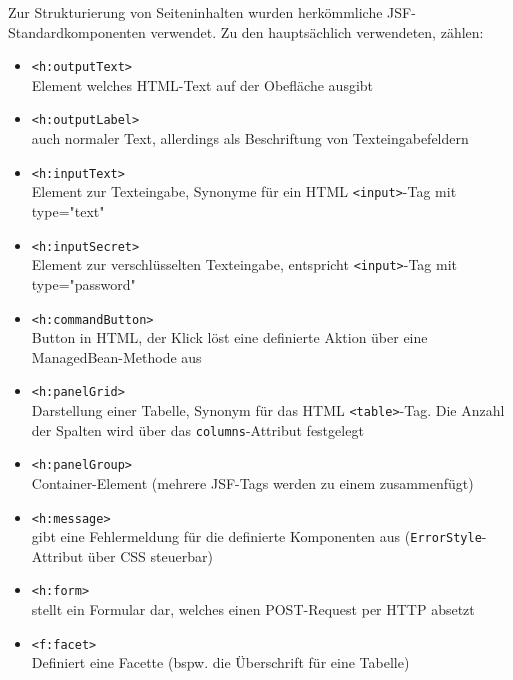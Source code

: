 \documentclass[12pt, twoside, a4paper, ngerman]{article}
\begin{document}
Zur Strukturierung von Seiteninhalten wurden herkömmliche \ac{JSF}-Standardkomponenten verwendet.
Zu den hauptsächlich verwendeten, zählen:
\begin{itemize}
  \item \texttt{<h:outputText>}\\
    Element welches HTML-Text auf der Obefläche ausgibt 
  
  \item \texttt{<h:outputLabel>}\\
    auch normaler Text, allerdings als Beschriftung von Texteingabefeldern
      
  \item \texttt{<h:inputText>}\\
    Element zur Texteingabe, Synonyme für ein HTML \texttt{<input>}-Tag mit type="text"
  
  \item \texttt{<h:inputSecret>}\\
    Element zur verschlüsselten Texteingabe, entspricht \texttt{<input>}-Tag mit type="password"
  
  \item \texttt{<h:commandButton>}\\
    Button in HTML, der Klick löst eine definierte Aktion über eine ManagedBean-Methode aus

  \item \texttt{<h:panelGrid>}\\
    Darstellung einer Tabelle, Synonym für das HTML \texttt{<table>}-Tag. Die Anzahl der Spalten wird über das \texttt{columns}-Attribut festgelegt
  
  \item \texttt{<h:panelGroup>}\\
    Container-Element (mehrere JSF-Tags werden zu einem zusammenfügt)
  
  \item \texttt{<h:message>}\\
    gibt eine Fehlermeldung für die definierte Komponenten aus (\texttt{ErrorStyle}-Attribut über \ac{CSS} steuerbar)
  
  \item \texttt{<h:form>}\\
    stellt ein Formular dar, welches einen POST-Request per HTTP absetzt
  
  \item \texttt{<f:facet>}\\
    Definiert eine Facette (bspw. die Überschrift für eine Tabelle)
\end{itemize}
\end{document}
